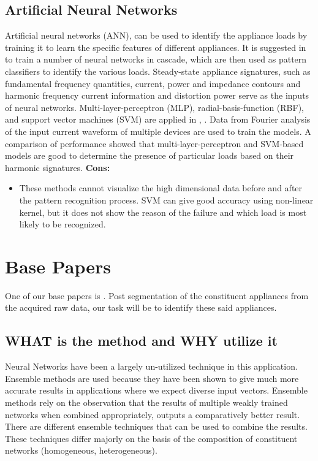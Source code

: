 \documentclass[11pt, a4paper]{article} %
\begin{document}
\subsection{Artificial Neural Networks}
Artificial neural networks (ANN), can be used to identify the appliance loads by training it to learn the specific features of different appliances. It is suggested in \cite{351862} to train a number of neural networks in cascade, which are then used as pattern classifiers to identify the various loads. Steady-state appliance signatures, such as fundamental frequency quantities, current, power and impedance contours and harmonic frequency current information and distortion power serve as the inputs of neural networks.
Multi-layer-perceptron (MLP), radial-basis-function (RBF), and support vector machines (SVM) are applied in \cite{950402}, \cite{1564224}. Data from Fourier analysis of the input current waveform of multiple devices are used to train the models. A comparison of performance showed that multi-layer-perceptron and SVM-based models are good to determine the presence of particular loads based on their harmonic signatures.
\newline
\textbf{Cons:}
\begin{itemize}
    \item These methods cannot visualize the high dimensional data before and after the pattern recognition process. SVM can give good accuracy using non-linear kernel, but it does not show the reason of the failure and which load is most likely to be recognized.
\end{itemize}

\section{Base Papers}
One of our base papers is \cite{barsim2018neural}.
Post segmentation of the constituent appliances from the acquired raw data, our task will be to identify these said appliances. 
\subsection{WHAT is the method and WHY utilize it}
Neural Networks have been a largely un-utilized technique in this application. Ensemble methods are used because they have been shown to give much more accurate results in applications where we expect diverse input vectors. Ensemble methods rely on the observation that the results of multiple weakly trained networks when combined appropriately, outputs a comparatively better result. There are different ensemble techniques that can be used to combine the results. These techniques differ majorly on the basis of the composition of constituent networks (homogeneous, heterogeneous). 
\end{document}
